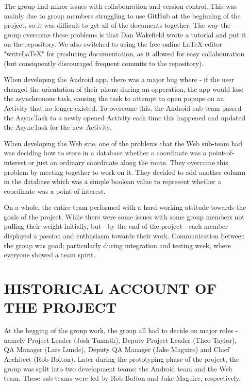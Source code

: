 \documentclass{project}
\begin{document}
The group had minor issues with collabouration and version control. This was mainly due to group members struggling to use GitHub at the beginning of the project, so it was difficult to get all of the documents together. The way the group overcome these problems is that Dan Wakefield wrote a tutorial and put it on the repository. We also switched to using the free online \LaTeX{} editor "write\LaTeX{}" for producing documentation, as it allowed for easy collabouration (but consiquently discouraged frequent commits to the repository).    

When developing the Android app, there was a major bug where - if the user changed the orientation of their phone during an opperation, the app would lose the asynchronous task, causing the task to attempt to open popups on an Activity that no longer existed. To overcome this, the Android sub-team passed the AsyncTask to a newly opened Activity each time this happened and updated the AsyncTask for the new Activity.

When developing the Web site, one of the problems that the Web sub-team had was deciding how to store in a database whether a coordinate was a point-of-interest or just an ordinary coordinate along the route. They overcame this problem by meeting together to work on it. They decided to add another column in the database which was a simple boolean value to represent whether a coordinate was a point-of-interest.

On a whole, the entire team performed with a hard-working attitude towards the goals of the project. While there were some issues with some group members not pulling their weight initially, but - by the end of the project - each member displayed a passion and enthusiasm towards their work. Communication between the group was good; particularly during integration and testing week, where everyone showed a team spirit.


\newpage


\section{HISTORICAL ACCOUNT OF THE PROJECT}

At the begging of the group work, the group all had to decide on major roles - namely Project Leader (Josh Tumath), Deputy Project Leader (Theo Taylor), QA Manager (Lars Lunde), Deputy QA Manager (Jake Maguire) and Chief Architect (Rob Bolton). Later during the prototyping phase of the project, the group was split into two development teams: the Android team and the Web team. These sub-teams were led by Rob Bolton and Jake Maguire, respectively.
\end{document}
